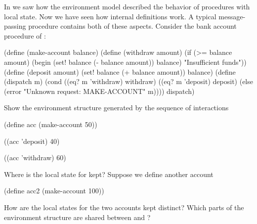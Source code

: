 \begin{exercise}
	\label{Exercise 3.11}
	In  we saw how the environment model described the behavior of procedures with local state.
	Now we have seen how internal definitions work.
	A typical message-passing procedure contains both of these aspects.
	Consider the bank account procedure of :
	\begin{scheme}
	  (define (make-account balance)
	    (define (withdraw amount)
	      (if (>= balance amount)
	          (begin (set! balance (- balance amount))
	                 balance)
	          "Insufficient funds"))
	    (define (deposit amount)
	      (set! balance (+ balance amount))
	      balance)
	    (define (dispatch m)
	      (cond ((eq? m 'withdraw) withdraw)
	            ((eq? m 'deposit) deposit)
	            (else
	             (error "Unknown request: MAKE-ACCOUNT"
	                    m))))
	    dispatch)
	\end{scheme}
	Show the environment structure generated by the sequence of interactions
	\begin{scheme}
	  (define acc (make-account 50))

	  ((acc 'deposit) 40)
	  ~~

	  ((acc 'withdraw) 60)
	  ~~
	\end{scheme}
	Where is the local state for  kept?
	Suppose we define another account
	\begin{scheme}
	  (define acc2 (make-account 100))
	\end{scheme}
	How are the local states for the two accounts kept distinct?
	Which parts of the environment structure are shared between  and ?
\end{exercise}
